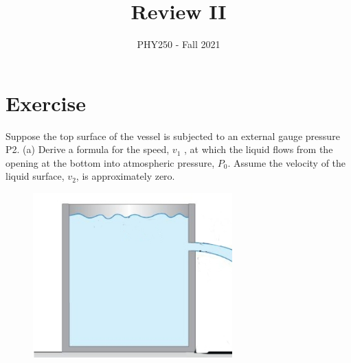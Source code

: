 \documentclass[12pt]{article}
\title{Review II}
\author{PHY250 - Fall 2021}
\date{}
\begin{document}
\maketitle






\setcounter{example}{1}

\section*{Exercise \theexample}
Suppose the top surface of the vessel is
subjected to an external gauge pressure P2. (a) Derive a
formula for the speed, $v_1$ , at which the liquid flows from the
opening at the bottom into atmospheric pressure, $P_0$.
Assume the velocity of the liquid surface, $v_2$, is approximately
zero.

\vspace{5mm}

\begin{figure}[h!]
    \begin{center}
      \includegraphics[height=2.5in]{images/1.jpg}
    \end{center}
  \end{figure}



\end{document}
